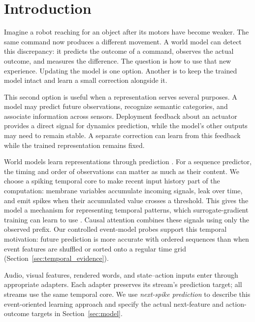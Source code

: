 \section{Introduction}
Imagine a robot reaching for an object after its motors have become weaker.
The same command now produces a different movement. A world model can detect
this discrepancy: it predicts the outcome of a command, observes the actual
outcome, and measures the difference. The question is how to use that new
experience. Updating the model is one option. Another is to keep the trained
model intact and learn a small correction alongside it.

This second option is useful when a representation serves several purposes.
A model may predict future observations, recognize semantic categories, and
associate information across sensors. Deployment feedback about an actuator
provides a direct signal for dynamics prediction, while the model's other
outputs may need to remain stable. A separate correction can learn from this feedback while the trained
representation remains fixed.

World models learn representations through prediction
\citep{ha2018worldmodels,hafner2019planet,hafner2020dreamer}.
For a sequence predictor, the timing and order of observations can matter as
much as their content. We choose a spiking temporal core to make recent input
history part of the computation: membrane variables accumulate incoming signals,
leak over time, and emit spikes when their accumulated value crosses a threshold.
This gives the model a mechanism for representing temporal patterns, which
surrogate-gradient training can learn to use \citep{yu2026beyondrate}.
Causal attention combines these signals using only the observed prefix.
Our controlled event-model probes support this temporal motivation: future
prediction is more accurate with ordered sequences than when event features
are shuffled or sorted onto a regular time grid
(Section~\ref{sec:temporal_evidence}).

Audio, visual features, rendered words, and state--action inputs enter through
appropriate adapters. Each adapter preserves its stream's prediction target; all streams use the
same temporal core. We use \emph{next-spike prediction} to describe this
event-oriented learning approach and specify the actual next-feature and
action-outcome targets in Section~\ref{sec:model}.

